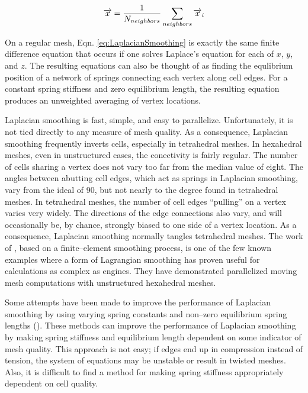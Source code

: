 \documentclass[a4paper,12pt,notitlepage]{article}
\begin{document}
\begin{equation}
  \label{eq:LaplacianSmoothing}
  \overrightarrow{x} ={1 \over N_{neighbors}} \sum_{neighbors} \overrightarrow{x} _{i}
\end{equation}

On a regular mesh, Eqn. \ref{eq:LaplacianSmoothing} is exactly the
same finite difference equation that occurs if one solves Laplace's
equation for each of $x$, $y$, and $z$.  The resulting equations can
also be thought of as finding the equlibrium position of a network of
springs connecting each vertex along cell edges.  For a constant
spring stiffness and zero equilibrium length, the resulting equation
produces an unweighted averaging of vertex locations.

Laplacian smoothing is fast, simple, and easy to parallelize.
Unfortunately, it is not tied directly to any measure of mesh quality.
As a consequence, Laplacian smoothing frequently inverts cells,
especially in tetrahedral meshes.  In hexahedral meshes, even in unstructured cases, the conectivity is fairly regular.  The
number of cells sharing a vertex does not vary too far from the median
value of eight.  The angles between abutting cell edges, which act as
springs in Laplacian smoothing, vary from the ideal of
\unit{90}\degree, but not nearly to the degree found in tetrahedral
meshes.  In tetrahedral meshes, the number of cell edges ``pulling''
on a vertex varies very widely.  The directions of the edge
connections also vary, and will occasionally be, by chance, strongly
biased to one side of a vertex location.  As a consequence, Laplacian
smoothing normally tangles tetrahedral meshes.  The work of
\cite{lucchini:sae2007}, based on a finite--element smoothing
process, is one of the few known examples where a form of Lagrangian
smoothing has proven useful for calculations as complex as engines.  They have demonstrated parallelized moving mesh computations with unstructured hexahedral meshes.

Some attempts have been made to improve the performance of Laplacian
smoothing by using varying spring constants and non--zero equilibrium
spring lengths (\cite{Anderson:JCP2005}).  These methods can improve the performance
of Laplacian smoothing by making spring stiffness and equilibrium
length dependent on some indicator of mesh quality.  This approach is
not easy; if edges end up in compression instead of tension, the
system of equations may be unstable or result in twisted meshes.
Also, it is difficult to find a method for making spring stiffness
appropriately dependent on cell quality.
\end{document}
